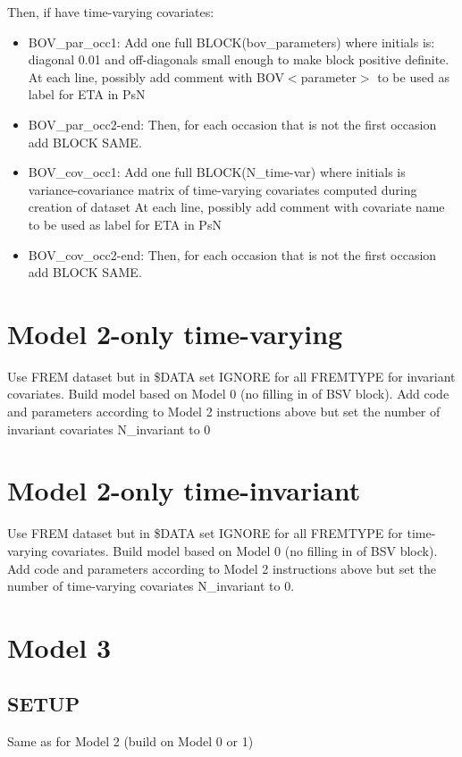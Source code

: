 Then, if have time-varying covariates:
\begin{itemize}
\item BOV\_par\_occ1: Add one full BLOCK(bov\_parameters) where initials is: diagonal 0.01 and off-diagonals small enough to make
block positive definite.
At each line, possibly add comment with BOV$<$parameter$>$ to be used as label for ETA in PsN
\item BOV\_par\_occ2-end: Then, for each occasion that is not the first occasion add BLOCK SAME.
\item BOV\_cov\_occ1: Add one full BLOCK(N\_time-var) where initials is variance-covariance matrix of time-varying covariates computed during creation of dataset
At each line, possibly add comment with covariate name to be used as label for ETA in PsN
\item BOV\_cov\_occ2-end: Then, for each occasion that is not the first occasion add BLOCK SAME.
\end{itemize}

\section{Model 2-only time-varying}
Use FREM dataset but in \$DATA set IGNORE for all FREMTYPE for invariant covariates. Build model based on Model 0 (no filling in of BSV block). Add code and parameters according to Model 2 instructions above but set the number of invariant covariates N\_invariant to 0

\section{Model 2-only time-invariant}
Use FREM dataset but in \$DATA set IGNORE for all FREMTYPE for time-varying covariates. Build model based on Model 0 (no filling in of BSV block). Add code and parameters according to Model 2 instructions above but set the number of time-varying covariates N\_invariant to 0.

\section{Model 3}
\subsection{SETUP}
Same as for Model 2 (build on Model 0 or 1)

